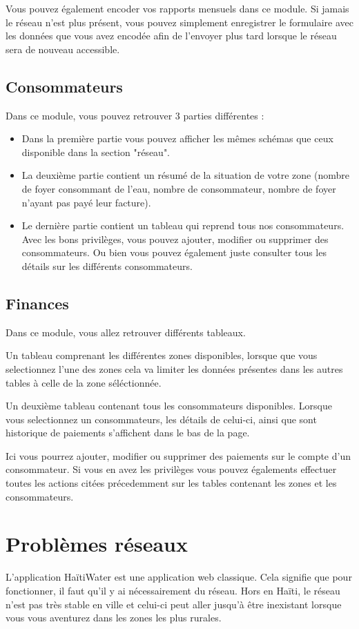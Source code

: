 \documentclass{EPL-master-thesis-covers-FR}
\begin{document}
				Vous pouvez également encoder vos rapports mensuels dans ce module. Si jamais le réseau n'est plus présent, vous pouvez simplement enregistrer le formulaire avec les données que vous avez encodée afin de l'envoyer plus tard lorsque le réseau sera de nouveau accessible.
			
			\subsection{Consommateurs}
				Dans ce module, vous pouvez retrouver 3 parties différentes :
				\begin{itemize}
					\item Dans la première partie vous pouvez afficher les mêmes schémas que ceux disponible dans la section "réseau".
					\item La deuxième partie contient un résumé de la situation de votre zone (nombre de foyer consommant de l'eau, nombre de consommateur, nombre de foyer n'ayant pas payé leur facture).
					\item Le dernière partie contient un tableau qui reprend tous nos consommateurs. Avec les bons privilèges, vous pouvez ajouter, modifier ou supprimer des consommateurs. Ou bien vous pouvez également juste consulter tous les détails sur les différents consommateurs.
				\end{itemize}
				
			
			\subsection{Finances}
				Dans ce module, vous allez retrouver différents tableaux.
				
				Un tableau comprenant les différentes zones disponibles, lorsque que vous selectionnez l'une des zones cela va limiter les données présentes dans les autres tables à celle de la zone séléctionnée.
				
				Un deuxième tableau contenant tous les consommateurs disponibles. Lorsque vous selectionnez un consommateurs, les détails de celui-ci, ainsi que sont historique de paiements s'affichent dans le bas de la page.
				
				Ici vous pourrez ajouter, modifier ou supprimer des paiements sur le compte d'un consommateur. Si vous en avez les privilèges vous pouvez égalements effectuer toutes les actions citées précedemment sur les tables contenant les zones et les consommateurs.
				

		\section{Problèmes réseaux}
			L'application HaïtiWater est une application web classique. Cela signifie que pour fonctionner, il faut qu'il y ai nécessairement du réseau. Hors en Haïti, le réseau n'est pas très stable en ville et celui-ci peut aller jusqu'à être inexistant lorsque vous vous aventurez dans les zones les plus rurales. 
		
\end{document}
